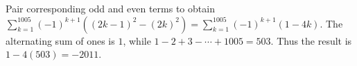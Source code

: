 Pair corresponding odd and even terms to obtain $\sum_{k=1}^{1005}(-1)^{k+1}((2k-1)^2-(2k)^2)=\sum_{k=1}^{1005}(-1)^{k+1}(1-4k)$. The alternating sum of ones is $1$, while $1-2+3-\cdots+1005=503$. Thus the result is $1-4(503)=\boxed{-2011}$.
